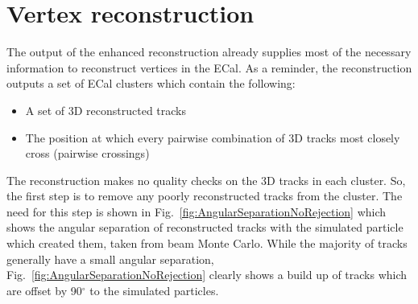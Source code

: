 \section{Vertex reconstruction}
\label{sec:VertexReconstruction}
The output of the enhanced reconstruction already supplies most of the necessary information to reconstruct vertices in the ECal.  As a reminder, the reconstruction outputs a set of ECal clusters which contain the following:
\begin{itemize}
  \item A set of 3D reconstructed tracks
  \item The position at which every pairwise combination of 3D tracks most closely cross (pairwise crossings)
\end{itemize}
The reconstruction makes no quality checks on the 3D tracks in each cluster.  So, the first step is to remove any poorly reconstructed tracks from the cluster.  The need for this step is shown in Fig.~\ref{fig:AngularSeparationNoRejection} which shows the angular separation of reconstructed tracks with the simulated particle which created them, taken from beam Monte Carlo.  While the majority of tracks generally have a small angular separation, Fig.~\ref{fig:AngularSeparationNoRejection} clearly shows a build up of tracks which are offset by 90$^\circ$ to the simulated particles.
\newline
\newline
